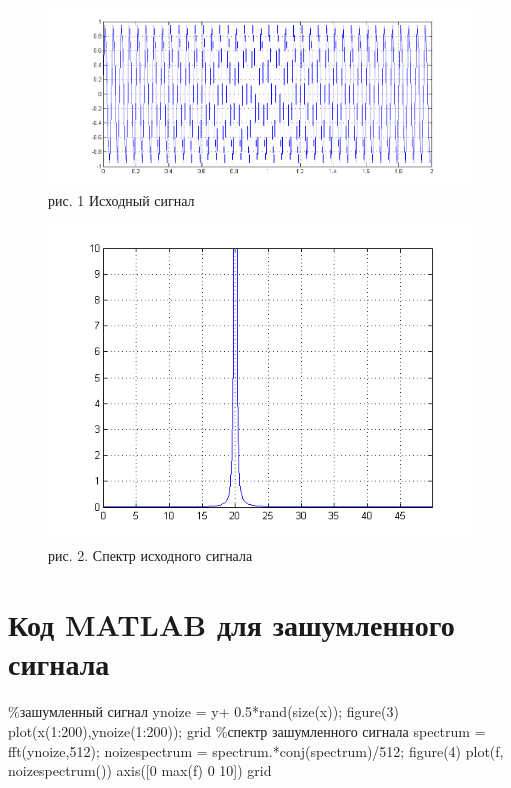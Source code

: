 \documentclass[10pt,a4paper]{report}
\begin{document}
\begin{figure}
\begin{center}
\includegraphics[angle=0, scale = 0.5]{1.png}\newline
рис. 1 Исходный сигнал\newline
\end{center}
\begin{center}
\includegraphics[angle=0, scale = 0.9]{2.png}\newline
рис. 2. Спектр исходного сигнала\newline
\end{center}
\end{figure}

\section{Код MATLAB для зашумленного сигнала}
\%зашумленный сигнал\newline
ynoize = y+ 0.5*rand(size(x));\newline
figure(3)\newline
plot(x(1:200),ynoize(1:200));\newline
grid\newline
\%спектр зашумленного сигнала\newline
spectrum = fft(ynoize,512);\newline
noizespectrum = spectrum.*conj(spectrum)/512;\newline
figure(4)\newline
plot(f, noizespectrum())\newline
axis([0 max(f) 0 10])\newline
grid\newline
\end{document}
